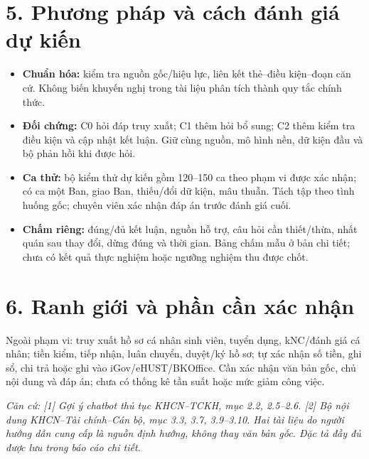 \documentclass[12pt,a4paper]{article}
\begin{document}
\section*{5. Phương pháp và cách đánh giá dự kiến}
\begin{itemize}
\item \textbf{Chuẩn hóa:} kiểm tra nguồn gốc/hiệu lực, liên kết thẻ--điều kiện--đoạn căn cứ. Không biến khuyến nghị trong tài liệu phân tích thành quy tắc chính thức.
\item \textbf{Đối chứng:} C0 hỏi đáp truy xuất; C1 thêm hỏi bổ sung; C2 thêm kiểm tra điều kiện và cập nhật kết luận. Giữ cùng nguồn, mô hình nền, dữ kiện đầu và bộ phản hồi khi được hỏi.
\item \textbf{Ca thử:} bộ kiểm thử dự kiến gồm 120--150 ca theo phạm vi được xác nhận; có ca một Ban, giao Ban, thiếu/đổi dữ kiện, mâu thuẫn. Tách tập theo tình huống gốc; chuyên viên xác nhận đáp án trước đánh giá cuối.
\item \textbf{Chấm riêng:} đúng/đủ kết luận, nguồn hỗ trợ, câu hỏi cần thiết/thừa, nhất quán sau thay đổi, dừng đúng và thời gian. Bảng chấm mẫu ở bản chi tiết; chưa có kết quả thực nghiệm hoặc ngưỡng nghiệm thu được chốt.
\end{itemize}

\section*{6. Ranh giới và phần cần xác nhận}
Ngoài phạm vi: truy xuất hồ sơ cá nhân sinh viên, tuyển dụng, kNC/đánh giá cá nhân; tiền kiểm, tiếp nhận, luân chuyển, duyệt/ký hồ sơ; tự xác nhận số tiền, ghi sổ, chi trả hoặc ghi vào iGov/eHUST/BKOffice. Cần xác nhận văn bản gốc, chủ nội dung và đáp án; chưa có thống kê tần suất hoặc mức giảm công việc.

{\footnotesize\textit{Căn cứ: [1] Gợi ý chatbot thủ tục KHCN--TCKH, mục 2.2, 2.5--2.6. [2] Bộ nội dung KHCN--Tài chính--Cán bộ, mục 3.3, 3.7, 3.9--3.10. Hai tài liệu do người hướng dẫn cung cấp là nguồn định hướng, không thay văn bản gốc. Đặc tả đầy đủ được lưu trong báo cáo chi tiết.}}
\end{document}
